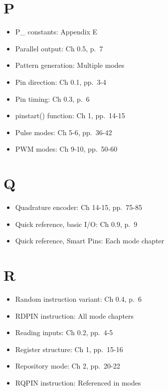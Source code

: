 \documentclass[11pt,a4paper,oneside,english]{book}
\begin{document}
\hypertarget{p}{%
\section{P}\label{p}}

\begin{itemize}
\tightlist
\item
  P\_ constants: Appendix E
\item
  Parallel output: Ch 0.5, p.~7
\item
  Pattern generation: Multiple modes
\item
  Pin direction: Ch 0.1, pp.~3-4
\item
  Pin timing: Ch 0.3, p.~6
\item
  pinstart() function: Ch 1, pp.~14-15
\item
  Pulse modes: Ch 5-6, pp.~36-42
\item
  PWM modes: Ch 9-10, pp.~50-60
\end{itemize}

\hypertarget{q}{%
\section{Q}\label{q}}

\begin{itemize}
\tightlist
\item
  Quadrature encoder: Ch 14-15, pp.~75-85
\item
  Quick reference, basic I/O: Ch 0.9, p.~9
\item
  Quick reference, Smart Pins: Each mode chapter
\end{itemize}

\hypertarget{r}{%
\section{R}\label{r}}

\begin{itemize}
\tightlist
\item
  Random instruction variant: Ch 0.4, p.~6
\item
  RDPIN instruction: All mode chapters
\item
  Reading inputs: Ch 0.2, pp.~4-5
\item
  Register structure: Ch 1, pp.~15-16
\item
  Repository mode: Ch 2, pp.~20-22
\item
  RQPIN instruction: Referenced in modes
\end{itemize}
\end{document}
